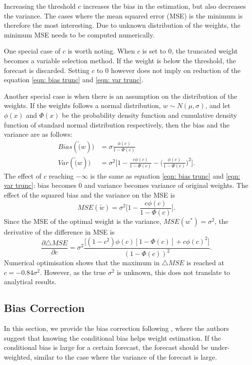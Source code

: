 \documentclass[11pt]{article}
\begin{document}
Increasing the threshold $c$ increases the bias in the estimation, but also decreases the variance. The cases where the mean squared error (MSE) is the minimum is therefore the most interesting. Due to unknown distribution of the weights, the minimum MSE needs to be computed numerically.

One special case of $c$ is worth noting. When $c$ is set to $0$, the truncated weight becomes a variable selection method. If the weight is below the threshold, the forecast is discarded. Setting $c$ to $0$ however does not imply on reduction of the equation \ref{eqn: bias trunc} and \ref{eqn: var trunc}.

Another special case is when there is an assumption on the distribution of the weights. If the weights follows a normal distribution, $w\sim N(\mu,\sigma)$, and let $\phi(x)$ and $\Phi(x)$ be the probability density function and cumulative density function of standard normal distribution respectively, then the bias and the variance are as follows:
\begin{equation}
\label{eqn: trunc norm}
\begin{aligned}
Bias(\tilde(w)) &= \sigma \frac{\phi(c)}{1-\Phi(c)}\\
Var(\tilde(w)) &= \sigma^2 \bigg[1-\frac{c\phi(c)}{1-\Phi(c)}-\big(\frac{\phi(c)}{1-\Phi(c)}\big)^2\bigg].
\end{aligned}
\end{equation}
The effect of $c$ reaching $-\infty$ is the same as equation \ref{eqn: bias trunc} and \ref{eqn: var trunc}: bias becomes $0$ and variance becomes variance of original weights. The effect of the squared bias and the variance on the MSE is
\begin{equation}
\label{eqn: trunc mse}
MSE(\tilde{w}) = \sigma^2 \bigg[ 1 -\frac{c\phi(c)}{1-\Phi(c)}\bigg].
\end{equation}
Since the MSE of the optimal weight is the variance, $MSE(w^*) = \sigma^2$, the derivative of the difference in MSE is
\begin{equation}
\frac{\partial \triangle MSE}{\partial c} = \sigma^2\frac{\bigg[(1-c^2)\phi(c)[1-\Phi(c)]+c\phi(c)^2\bigg]}{(1-\Phi(c))^2}.
\end{equation}
Numerical optimisation shows that the maximum in $\triangle MSE$ is reached at $c=-0.84\sigma^2$. However, as the true $\sigma^2$ is unknown, this does not translate to analytical results.

\subsection{Bias Correction}\label{bias-correction}
In this section, we provide the bias correction following \cite{Gibbs2017}, where the authors suggest that knowing the conditional bias helps weight estimation. If the conditional bias is large for a certain forecast, the forecast should be under-weighted, similar to the case where the variance of the forecast is large.
\end{document}
